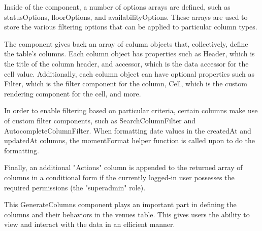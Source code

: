 \begin{justify}
\begin{itemize}
\begin{itemize}
                    \vspace{0.25cm}
                    \newendline Inside of the component, a number of options arrays are defined, such as statusOptions, floorOptions, and availabilityOptions. These arrays are used to store the various filtering options that can be applied to particular column types.
                    
                    \vspace{0.25cm}
                    \newendline The component gives back an array of column objects that, collectively, define the table's columns. Each column object has properties such as Header, which is the title of the column header, and accessor, which is the data accessor for the cell value. Additionally, each column object can have optional properties such as Filter, which is the filter component for the column, Cell, which is the custom rendering component for the cell, and more.
                    
                    \vspace{0.25cm}
                    \newendline In order to enable filtering based on particular criteria, certain columns make use of custom filter components, such as SearchColumnFilter and AutocompleteColumnFilter. When formatting date values in the createdAt and updatedAt columns, the momentFormat helper function is called upon to do the formatting.
                    
                    \vspace{0.25cm}
                    \newendline Finally, an additional "Actions" column is appended to the returned array of columns in a conditional form if the currently logged-in user possesses the required permissions (the "superadmin" role).
                    
                    \vspace{0.25cm}
                    \newendline This GenerateColumns component plays an important part in defining the columns and their behaviors in the venues table. This gives users the ability to view and interact with the data in an efficient manner.


\end{itemize}
\end{itemize}
\end{justify}
